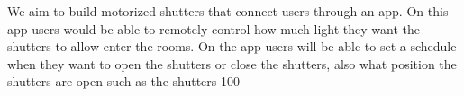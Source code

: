 We aim to build motorized shutters that connect users through an app. On this app users would be able to remotely control how much light they want the shutters to allow enter the rooms. On the app users will be able to set a schedule when they want to open the shutters or close the shutters, also what position the shutters are open such as the shutters 100%